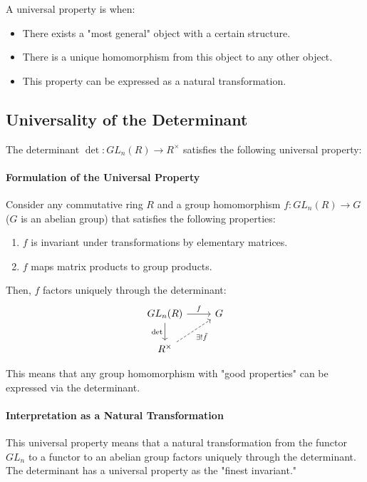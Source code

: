 \documentclass[uplatex,a4j,12pt,dvipdfmx]{jsarticle}
\begin{document}
A universal property is when:

\begin{itemize}
	\item There exists a "most general" object with a certain structure.
	\item There is a unique homomorphism from this object to any other object.
	\item This property can be expressed as a natural transformation.
\end{itemize}

\subsection{Universality of the Determinant}

The determinant $\det: GL_n(R) \to R^\times$ satisfies the following universal property:

\paragraph{Formulation of the Universal Property}
Consider any commutative ring $R$ and a group homomorphism $f: GL_n(R) \to G$ ($G$ is an abelian group) that satisfies the following properties:
\begin{enumerate}
	\item $f$ is invariant under transformations by elementary matrices.
	\item $f$ maps matrix products to group products.
\end{enumerate}

Then, $f$ factors uniquely through the determinant:
\[
	\begin{tikzcd}
		GL_n(R) \arrow[r, "f"] \arrow[d, "\det"'] & G \\
		R^\times \arrow[ru, dashed, "\exists! \tilde{f}"'] &
	\end{tikzcd}
\]

This means that any group homomorphism with "good properties" can be expressed via the determinant.

\paragraph{Interpretation as a Natural Transformation}
This universal property means that a natural transformation from the functor $GL_n$ to a functor to an abelian group factors uniquely through the determinant. The determinant has a universal property as the "finest invariant."
\end{document}

